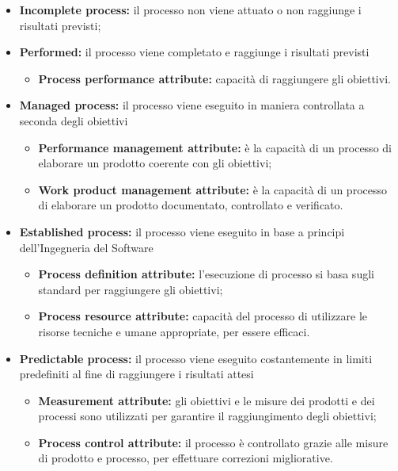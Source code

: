 \begin{itemize}
	\item \textbf{Incomplete process:} il processo non viene attuato o non raggiunge i risultati previsti;
	
	\item \textbf{Performed:} il processo viene completato e raggiunge i risultati previsti
	\begin{itemize}
		\item\textbf{Process performance attribute:} capacità di raggiungere 
		gli obiettivi.
	\end{itemize}
	
	\item \textbf{Managed process:} il processo viene eseguito in maniera controllata a seconda degli obiettivi
	\begin{itemize}
		\item \textbf{Performance management attribute:} è la capacità di un processo di elaborare un prodotto coerente con gli obiettivi;
		\item \textbf{Work product management attribute:} è la capacità di un processo di elaborare un prodotto documentato, controllato e verificato.
	\end{itemize}
	
	\item \textbf{Established process:} il processo viene eseguito in base a 
	principi dell'Ingegneria del Software
	\begin{itemize}
		\item \textbf{Process definition attribute:} l'esecuzione di processo si basa sugli standard per raggiungere gli obiettivi;
		\item \textbf{Process resource attribute:} capacità del processo di utilizzare le risorse tecniche e umane appropriate, per essere efficaci.
	\end{itemize}
	
	\item \textbf{Predictable process:} il processo viene eseguito costantemente in limiti predefiniti al fine di raggiungere i risultati attesi
	\begin{itemize}
		\item \textbf{Measurement attribute:} gli obiettivi e le misure dei prodotti e dei processi sono utilizzati per garantire il raggiungimento degli obiettivi;
		\item \textbf{Process control attribute:} il processo è controllato grazie alle misure di prodotto e processo, per effettuare correzioni migliorative.
	\end{itemize}
	

\end{itemize}
